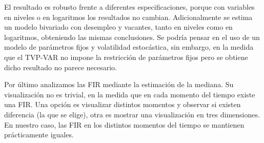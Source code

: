 \documentclass[12pt,oneside]{reedthesis}
\begin{document}
El resultado es robusto frente a diferentes especificaciones, porque con variables en niveles o en logaritmos los resultados no cambian. Adicionalmente se estima un modelo bivariado con desempleo y vacantes, tanto en niveles como en logaritmos, obteniendo las mismas conclusiones. Se podría pensar en el uso de un modelo de parámetros fijos y volatilidad estocástica, sin embargo, en la medida que el TVP-VAR no impone la restricción de parámetros fijos pero se obtiene dicho resultado no parece necesario.

Por último analizamos las FIR mediante la estimación de la mediana. Su visualización no es trivial, en la medida que en cada momento del tiempo existe una FIR. Una opción es visualizar distintos momentos y observar si existen diferencia (la que se elige), otra es mostrar una visualización en tres dimensiones. En nuestro caso, las FIR en los distintos momentos del tiempo se mantienen prácticamente iguales.
\end{document}
